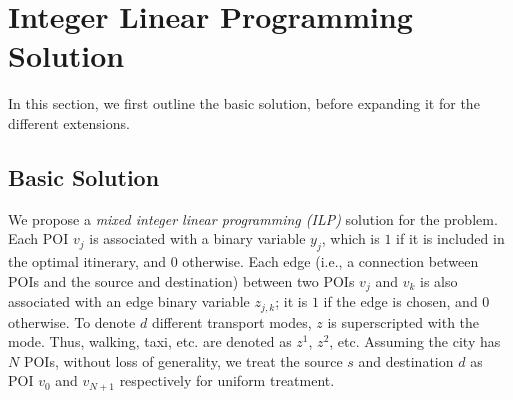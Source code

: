 \section{Integer Linear Programming Solution}
\label{sec:ilp}

In this section, we first outline the basic solution, before expanding it for the different extensions.

\subsection{Basic Solution}
\label{sec:basic}

We propose a \emph{mixed integer linear programming (ILP)} solution for the \trip problem.
Each POI $v_{j}$ is associated with a binary variable $y_{j}$, which is $1$ if it is included in the optimal itinerary, and $0$ otherwise.
Each edge (i.e., a connection between POIs and the source and destination) between two POIs $v_{j}$ and $v_{k}$ is also associated with an edge binary variable $z_{j,k}$; it is $1$ if the edge is chosen, and $0$ otherwise.
To denote $d$ different transport modes, $z$ is superscripted with the mode.
Thus, walking, taxi, etc. are denoted as $z^1$, $z^2$, etc.
Assuming the city has $N$ POIs, without loss of generality, we
treat the source $s$ and destination $d$ as POI $v_{0}$ and $v_{{N+1}}$ respectively for uniform treatment.

